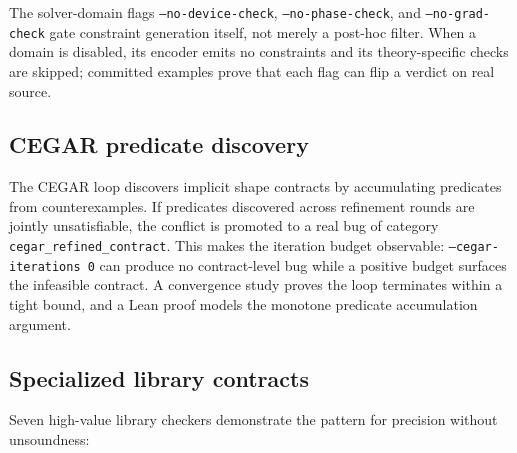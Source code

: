 \documentclass[11pt]{article}
\begin{document}
The solver-domain flags
\texttt{--no-device-check}, \texttt{--no-phase-check}, and
\texttt{--no-grad-check} gate constraint generation itself, not merely a
post-hoc filter.  When a domain is disabled, its encoder emits no constraints
and its theory-specific checks are skipped; committed examples prove that each
flag can flip a verdict on real source.

\subsection{CEGAR predicate discovery}

The CEGAR loop discovers implicit shape contracts by accumulating predicates
from counterexamples.  If predicates discovered across refinement rounds are
jointly unsatisfiable, the conflict is promoted to a real bug of category
\texttt{cegar\_refined\_contract}.  This makes the iteration budget observable:
\texttt{--cegar-iterations 0} can produce no contract-level bug while a positive
budget surfaces the infeasible contract.  A convergence study proves the loop
terminates within a tight bound, and a Lean proof models the monotone predicate
accumulation argument.

\subsection{Specialized library contracts}

Seven high-value library checkers demonstrate the pattern for precision without
unsoundness:
\end{document}
